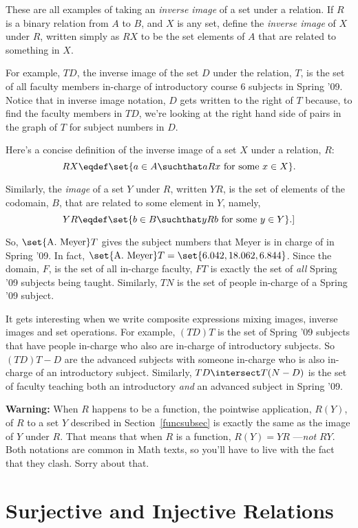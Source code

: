 These are all examples of taking an \emph{inverse image} of a set under a
relation.  If $R$ is a binary relation from $A$ to $B$, and $X$ is any
set, define the \emph{inverse image} of $X$ under $R$, written simply as
$RX$ to be the set elements of $A$ that are related to something in $X$.

For example, $TD$, the inverse image of the set $D$ under the relation,
$T$, is the set of all faculty members in-charge of introductory course 6
subjects in Spring '09.  Notice that in inverse image notation, $D$ gets
written to the right of $T$ because, to find the faculty members in $TD$,
we're looking at the right hand side of pairs in the graph of $T$ for
subject numbers in $D$.

Here's a concise definition of the inverse image of a set $X$ under
a relation, $R$:
\[
RX \eqdef \set{a \in A \suchthat aRx \text{ for some } x \in X}.
\]

Similarly, the \emph{image} of a set $Y$ under $R$, written $YR$, is the
set of elements of the codomain, $B$, that are related to some element in
$Y$, namely,
\[
YR \eqdef \set{b \in B \suchthat yRb \text{ for some } y \in Y}.
]\]

So, $\set{\text{A. Meyer}}T$ gives the subject numbers that Meyer is in
charge of in Spring '09.  In fact, $\set{\text{A. Meyer}}T = \set{6.042,
  18.062, 6.844}$.  Since the domain, $F$, is the set of all in-charge
faculty, $FT$ is exactly the set of \emph{all} Spring '09 subjects being
taught.  Similarly, $TN$ is the set of people in-charge of a Spring '09
subject.

It gets interesting when we write composite expressions mixing images,
inverse images and set operations.  For example, $(TD)T$ is the set of
Spring '09 subjects that have people in-charge who also are in-charge of
introductory subjects.  So $(TD)T - D$ are the advanced subjects with
someone in-charge who is also in-charge of an introductory subject.
Similarly, $TD \intersect T(N-D)$ is the set of faculty teaching both an
introductory \emph{and} an advanced subject in Spring '09.

\textbf{Warning:} When $R$ happens to be a function, the pointwise
application, $R(Y)$, of $R$ to a set $Y$ described in
Section~\ref{funcsubsec} is exactly the same as the image of $Y$ under
$R$.  That means that when $R$ is a function, $R(Y) = YR$ ---\emph{not}
$RY$.  Both notations are common in Math texts, so you'll have to live
with the fact that they clash.  Sorry about that.

\section{Surjective and Injective Relations}


